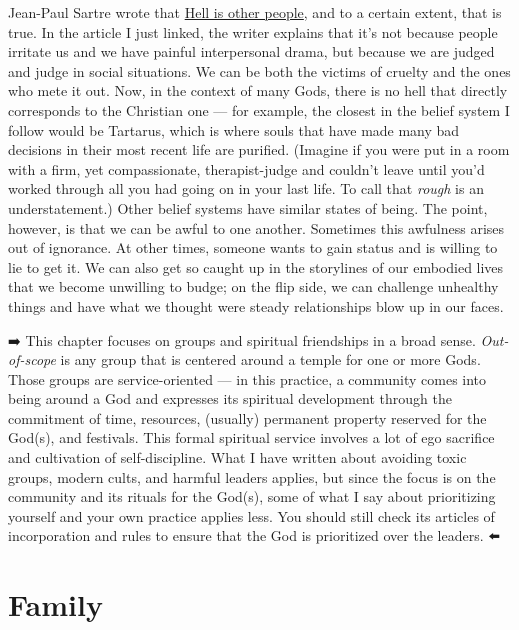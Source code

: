 \documentclass[
]{book}
\begin{document}
Jean-Paul Sartre wrote that \href{https://www.vox.com/2014/11/17/7229547/philosophy-quotes-misunderstood-wittgenstein-sartre-descartes}{Hell is other people}, and to a certain extent, that is true. In the article I just linked, the writer explains that it's not because people irritate us and we have painful interpersonal drama, but because we are judged and judge in social situations. We can be both the victims of cruelty and the ones who mete it out. Now, in the context of many Gods, there is no hell that directly corresponds to the Christian one --- for example, the closest in the belief system I follow would be Tartarus, which is where souls that have made many bad decisions in their most recent life are purified. (Imagine if you were put in a room with a firm, yet compassionate, therapist-judge and couldn't leave until you'd worked through all you had going on in your last life. To call that \emph{rough} is an understatement.) Other belief systems have similar states of being. The point, however, is that we can be awful to one another. Sometimes this awfulness arises out of ignorance. At other times, someone wants to gain status and is willing to lie to get it. We can also get so caught up in the storylines of our embodied lives that we become unwilling to budge; on the flip side, we can challenge unhealthy things and have what we thought were steady relationships blow up in our faces.

➡️ This chapter focuses on groups and spiritual friendships in a broad sense. \emph{Out-of-scope} is any group that is centered around a temple for one or more Gods. Those groups are service-oriented --- in this practice, a community comes into being around a God and expresses its spiritual development through the commitment of time, resources, (usually) permanent property reserved for the God(s), and festivals. This formal spiritual service involves a lot of ego sacrifice and cultivation of self-discipline. What I have written about avoiding toxic groups, modern cults, and harmful leaders applies, but since the focus is on the community and its rituals for the God(s), some of what I say about prioritizing yourself and your own practice applies less. You should still check its articles of incorporation and rules to ensure that the God is prioritized over the leaders. ⬅️

\hypertarget{family}{%
\section{Family}\label{family}}
\end{document}
